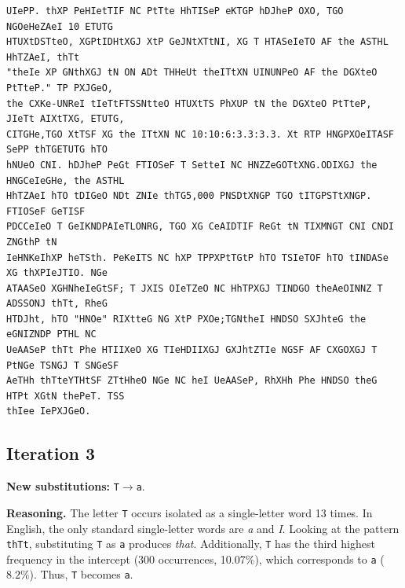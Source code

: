 \documentclass[11pt,a4paper]{article}
\begin{document}
\begin{lstlisting}[style=ciphertext,caption={Complete text after iteration 2}]
UIePP. thXP PeHIetTIF NC PtTte HhTISeP eKTGP hDJheP OXO, TGO NGOeHeZAeI 10 ETUTG
HTUXtDSTteO, XGPtIDHtXGJ XtP GeJNtXTtNI, XG T HTASeIeTO AF the ASTHL HhTZAeI, thTt
"theIe XP GNthXGJ tN ON ADt THHeUt theITtXN UINUNPeO AF the DGXteO PtTteP." TP PXJGeO,
the CXKe-UNReI tIeTtFTSSNtteO HTUXtTS PhXUP tN the DGXteO PtTteP, JIeTt AIXtTXG, ETUTG,
CITGHe,TGO XtTSF XG the ITtXN NC 10:10:6:3.3:3.3. Xt RTP HNGPXOeITASF SePP thTGETUTG hTO
hNUeO CNI. hDJheP PeGt FTIOSeF T SetteI NC HNZZeGOTtXNG.ODIXGJ the HNGCeIeGHe, the ASTHL
HhTZAeI hTO tDIGeO NDt ZNIe thTG5,000 PNSDtXNGP TGO tITGPSTtXNGP. FTIOSeF GeTISF
PDCCeIeO T GeIKNDPAIeTLONRG, TGO XG CeAIDTIF ReGt tN TIXMNGT CNI CNDI ZNGthP tN
IeHNKeIhXP heTSth. PeKeITS NC hXP TPPXPtTGtP hTO TSIeTOF hTO tINDASe XG thXPIeJTIO. NGe
ATAASeO XGHNheIeGtSF; T JXIS OIeTZeO NC HhTPXGJ TINDGO theAeOINNZ T ADSSONJ thTt, RheG
HTDJht, hTO "HNOe" RIXtteG NG XtP PXOe;TGNtheI HNDSO SXJhteG the eGNIZNDP PTHL NC
UeAASeP thTt Phe HTIIXeO XG TIeHDIIXGJ GXJhtZTIe NGSF AF CXGOXGJ T PtNGe TSNGJ T SNGeSF
AeTHh thTteYTHtSF ZTtHheO NGe NC heI UeAASeP, RhXHh Phe HNDSO theG HTPt XGtN thePeT. TSS
thIee IePXJGeO.
\end{lstlisting}

\newpage
\subsection{Iteration 3}

\noindent\textbf{New substitutions:} \texttt{T}$\rightarrow$\texttt{a}.\par
\smallskip
\noindent\textbf{Reasoning.} The letter \texttt{T} occurs isolated as a single-letter word 13 times. In English, the only standard single-letter words are \textit{a} and \textit{I}. Looking at the pattern \texttt{thTt}, substituting \texttt{T} as \texttt{a} produces \textit{that}. Additionally, \texttt{T} has the third highest frequency in the intercept (300 occurrences, 10.07\%), which corresponds to \texttt{a} ($8.2\%$). Thus, \texttt{T} becomes \texttt{a}.
\end{document}

